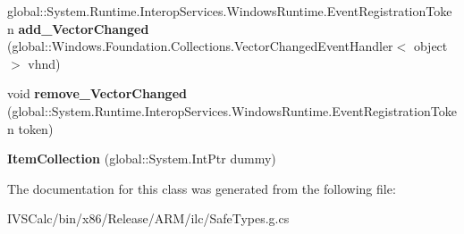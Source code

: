 \begin{DoxyCompactItemize}
\item 
\mbox{\label{class_windows_1_1_u_i_1_1_xaml_1_1_controls_1_1_item_collection_a920f67d58690f01bbcb0c548e064083c}} 
global\+::\+System.\+Runtime.\+Interop\+Services.\+Windows\+Runtime.\+Event\+Registration\+Token {\bfseries add\+\_\+\+Vector\+Changed} (global\+::\+Windows.\+Foundation.\+Collections.\+Vector\+Changed\+Event\+Handler$<$ object $>$ vhnd)
\item 
\mbox{\label{class_windows_1_1_u_i_1_1_xaml_1_1_controls_1_1_item_collection_afdfa282fb26aff5d9800af371b2a81a6}} 
void {\bfseries remove\+\_\+\+Vector\+Changed} (global\+::\+System.\+Runtime.\+Interop\+Services.\+Windows\+Runtime.\+Event\+Registration\+Token token)
\item 
\mbox{\label{class_windows_1_1_u_i_1_1_xaml_1_1_controls_1_1_item_collection_a42920e204a2cf93fedbd9741da1bd6e6}} 
{\bfseries Item\+Collection} (global\+::\+System.\+Int\+Ptr dummy)
\end{DoxyCompactItemize}


The documentation for this class was generated from the following file\+:\begin{DoxyCompactItemize}
\item 
I\+V\+S\+Calc/bin/x86/\+Release/\+A\+R\+M/ilc/Safe\+Types.\+g.\+cs\end{DoxyCompactItemize}
